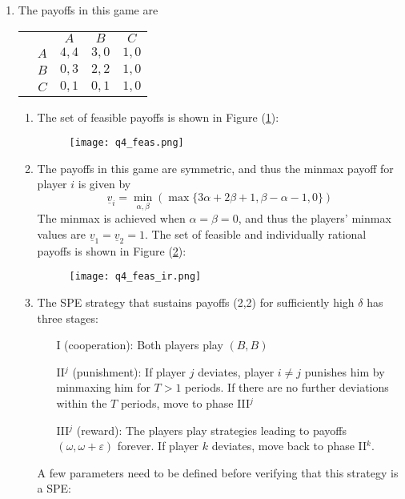 \documentclass[11pt]{article}
\begin{document}
\begin{enumerate}
	\item The payoffs in this game are
	\begin{table}[!htbp]
		\centering
		\setlength{\extrarowheight}{2pt}
		\begin{tabular}{cc|c|c|c|}
			& \multicolumn{1}{c}{} & \multicolumn{1}{c}{$A$}  & \multicolumn{1}{c}{$B$} & \multicolumn{1}{c}{$ C $} \\\cline{3-5}
			& $A$ & $ 4,4 $ & $ 3,0 $ & $ 1,0 $\\\cline{3-5}
			& $B$ & $ 0,3 $ & $ 2,2 $ & $ 1,0 $\\\cline{3-5}
			& $C$ & $ 0,1 $ & $ 0,1 $ & $ 1,0 $\\\cline{3-5}
		\end{tabular}
	\end{table}
	\begin{enumerate}
		\item The set of feasible payoffs is shown in Figure (\ref{q4_feas}): 
		
		\begin{figure}[h]
			\centering
			\caption{}
			\texttt{[image: q4\_feas.png]}
			\label{q4_feas}
		\end{figure}
		
		\item The payoffs in this game are symmetric, and thus the minmax payoff for player $ i $ is given by 
		\[\underline{v}_i = \min_{\alpha, \beta} (\max\{3\alpha + 2\beta + 1, \beta - \alpha - 1, 0\})\]
		The minmax is achieved when $ \alpha = \beta = 0 $, and thus the players' minmax values are $ \underline{v}_1 = \underline{v}_2 = 1 $. The set of feasible and individually rational payoffs is shown in Figure (\ref{q4_feas_ir}): 
		\newpage
		\begin{figure}[h]
			\centering
			\caption{}
			\texttt{[image: q4\_feas\_ir.png]}
			\label{q4_feas_ir}
		\end{figure}
		
		\item The SPE strategy that sustains payoffs (2,2) for sufficiently high $\delta$ has three stages:
		\begin{itemize}
			\item [I] (cooperation): Both players play $ (B,B) $
			\item [II$ ^j $] (punishment): If player $ j $ deviates, player $ i\neq j $ punishes him by minmaxing him for $ T > 1 $ periods. If there are no further deviations within the $ T $ periods, move to phase III$ ^j $
			\item [III$ ^j $] (reward): The players play strategies leading to payoffs $ (\omega, \omega + \varepsilon) $ forever. If player $ k $ deviates, move back to phase II$ ^k $.
		\end{itemize}
		A few parameters need to be defined before verifying that this strategy is a SPE:
		

\end{enumerate}
\end{enumerate}
\end{document}
